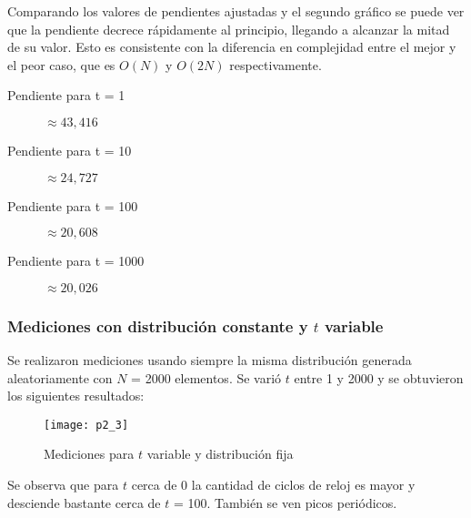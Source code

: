 \begin{multicols}{2}
Comparando los valores de pendientes ajustadas y el segundo gráfico se puede ver que la pendiente decrece rápidamente al principio, llegando a alcanzar la mitad de su valor. Esto es consistente con la diferencia en complejidad entre el mejor y el peor caso, que es $O(N)$ y $O(2N)$ respectivamente.

\begin{description}
\item[Pendiente para t = 1] $\approx43,416$
\item[Pendiente para t = 10] $\approx24,727$
\item[Pendiente para t = 100] $\approx20,608$
\item[Pendiente para t = 1000] $\approx20,026$
\end{description}
\end{multicols}

\subsubsection{Mediciones con distribución constante y $t$ variable}

Se realizaron mediciones usando siempre la misma distribución generada aleatoriamente con $N$ = 2000 elementos. Se varió $t$ entre 1 y 2000 y se obtuvieron los siguientes resultados:

\begin{figure}[h!]
\texttt{[image: p2\_3]}
\caption{Mediciones para $t$ variable y distribución fija}
\end{figure}

Se observa que para $t$ cerca de 0 la cantidad de ciclos de reloj es mayor y desciende bastante cerca de $t$ = 100.%
También se ven picos periódicos. %
